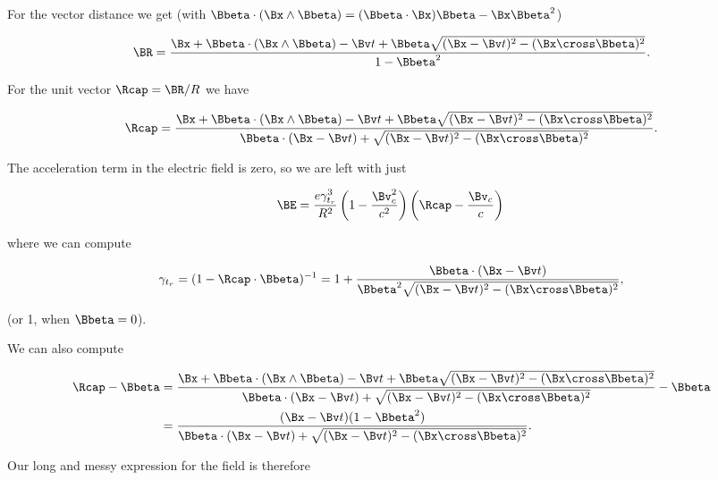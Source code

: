 For the vector distance we get (with $\Bbeta \cdot (\Bx \wedge \Bbeta) = (\Bbeta \cdot \Bx) \Bbeta - \Bx \Bbeta^2$)

\begin{equation}\label{eqn:relElectroDynProblemSet5:730}
\BR = \frac{\Bx + \Bbeta \cdot (\Bx \wedge \Bbeta) - \Bv t + \Bbeta \sqrt{ (\Bx - \Bv t)^2 - (\Bx \cross \Bbeta)^2 }}{ 1 - \Bbeta^2 }.
\end{equation}

For the unit vector $\Rcap = \BR/R$ we have

\begin{equation}\label{eqn:relElectroDynProblemSet5:750}
\Rcap = \frac{\Bx + \Bbeta \cdot (\Bx \wedge \Bbeta) - \Bv t + \Bbeta \sqrt{ (\Bx - \Bv t)^2 - (\Bx \cross \Bbeta)^2 }}{ 
\Bbeta \cdot (\Bx - \Bv t) + \sqrt{ (\Bx - \Bv t)^2 - (\Bx \cross \Bbeta)^2 } 
}.
\end{equation}

The acceleration term in the electric field is zero, so we are left with just

\begin{equation}\label{eqn:relElectroDynProblemSet5:770}
\BE
= 
\frac{e \gamma_{t_r}^3}{R^2} 
\left( 1 - \frac{\Bv_c^2}{c^2} \right) 
\left( \Rcap - \frac{\Bv_c}{c} \right) \\
\end{equation}

where we can compute

\begin{equation}\label{eqn:relElectroDynProblemSet5:790}
\gamma_{t_r} = (1 - \Rcap \cdot \Bbeta)^{-1} = 1 + \frac{\Bbeta \cdot (\Bx - \Bv t) }{ \Bbeta^2 \sqrt{ (\Bx - \Bv t)^2 - (\Bx \cross \Bbeta)^2 } },
\end{equation}

(or 1, when $\Bbeta = 0$).

We can also compute

\begin{align*}
\Rcap - \Bbeta &= 
\frac{\Bx + \Bbeta \cdot (\Bx \wedge \Bbeta) - \Bv t + \Bbeta \sqrt{ (\Bx - \Bv t)^2 - (\Bx \cross \Bbeta)^2 }}{ 
\Bbeta \cdot (\Bx - \Bv t) + \sqrt{ (\Bx - \Bv t)^2 - (\Bx \cross \Bbeta)^2 } 
} - \Bbeta \\
&=
\frac{(\Bx - \Bv t)(1 -\Bbeta^2)}{
\Bbeta \cdot (\Bx - \Bv t) + \sqrt{ (\Bx - \Bv t)^2 - (\Bx \cross \Bbeta)^2 } 
}.
\end{align*}

Our long and messy expression for the field is therefore

